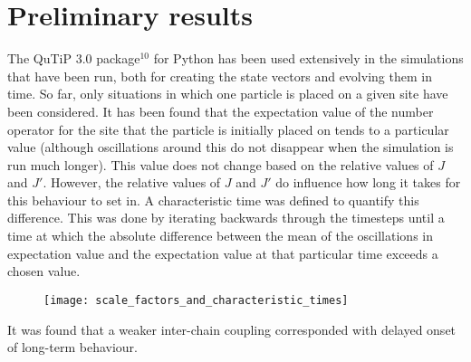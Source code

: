 \documentclass[a4paper,10pt]{article}
\begin{document}
\section{Preliminary results}
The QuTiP 3.0 package$^10$ for Python has been used extensively in the simulations that have been run, both for creating the state vectors and evolving them in time. 
So far, only situations in which one particle is placed on a given site have been considered. It has been found that the expectation value of the number operator for the site that 
the particle is initially placed on tends to a particular value (although oscillations around this do not disappear when the simulation is run much longer). This value does not change
based on the relative values of $J$ and $J'$. However, the relative values of $J$ and $J'$ do influence how long it takes for this behaviour to set in. A characteristic time was 
defined to quantify this difference. This was done by iterating backwards through the timesteps until a time at which the absolute difference between the mean of the oscillations in
expectation value and the expectation value at that particular time exceeds a chosen value. 

\begin{figure}[H]
 \texttt{[image: scale\_factors\_and\_characteristic\_times]}
 \centering
\end{figure}

It was found that a weaker inter-chain coupling corresponded with delayed onset of long-term behaviour.
\end{document}
